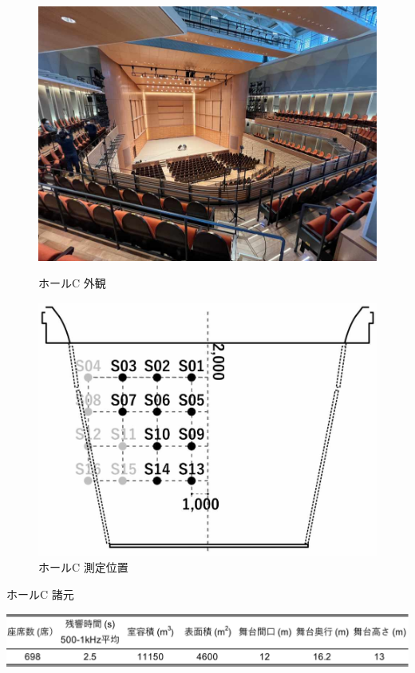 \documentclass[11pt,a4j]{jreport}
\begin{document}
\begin{figure}[H]
  \begin{minipage}{.5\linewidth}
    \centering
    \includegraphics[width=.7\linewidth]{images/measuredHalls/resized/picture_c.jpg}
    \caption*{ホールC 外観}  
  \end{minipage}%
  \begin{minipage}{.5\linewidth}
    \centering
    \includegraphics[width=.7\linewidth]{images/measuredHalls/resized/flat_c.jpg}
    \caption*{ホールC 測定位置}
  \end{minipage}
\end{figure}

\vspace{2\baselineskip}

\begin{table}[H]
  \centering
  \caption*{ホールC 諸元}
  \includegraphics[width=.8\linewidth]{images/measuredHalls/informationTable/c_wide.pdf}
\end{table}
\end{document}
